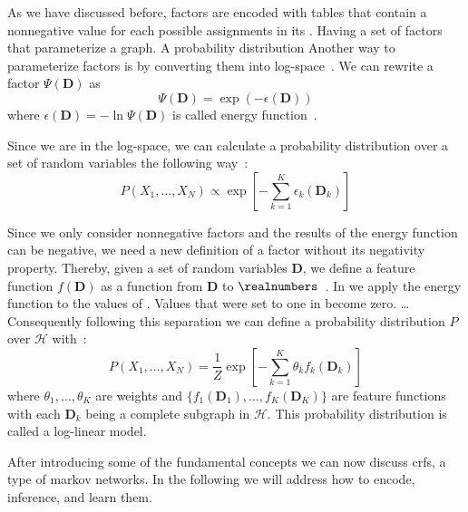 As we have discussed before, \glspl{factor} are encoded with tables that contain a nonnegative value for each possible assignments in its .
Having a set of \glspl{factor} that parameterize a graph. A probability distribution
Another way to parameterize \glspl{factor} is by converting them into log-space~\citep{koller2009probabilistic}.
We can rewrite a factor $\Psi(\bm{D})$ as
\begin{equation*}
  \label{equ:energy-function}
  \Psi(\bm{D}) = \exp(-\epsilon(\bm{D}))
\end{equation*}
where $\epsilon(\bm{D})=-\ln\Psi(\bm{D})$ is called \gls{energy function}~\citep{koller2009probabilistic}.

Since we are in the log-space, we can calculate a \gls{probability distribution} over a set of \glspl{random variable} the following way~\citep{koller2009probabilistic}:
\begin{equation*}
  \label{equ:p-energy-function}
  P(X_1,\dots,X_N) \propto \exp\left [-\sum_{k=1}^K\epsilon_k(\bm{D}_k)\right ]
\end{equation*}

Since we only consider nonnegative \glspl{factor} and the results of the \gls{energy function} can be negative, we need a new definition of a \gls{factor} without its negativity property.
Thereby, given a set of \glspl{random variable} $\bm{D}$, we define a \gls{feature function} $f(\bm{D})$ as a function from $\bm{D}$ to $\realnumbers$~\citep{koller2009probabilistic}.
In  we apply the \gls{energy function} to the values of .
Values that were set to one in  become zero. \dots{}
Consequently following this separation we can define a \gls{probability distribution} $P$ over $\mathcal{H}$ with~\citep{koller2009probabilistic}:
\begin{equation}
  \label{equ:log-linear-model}
  P(X_1,\dots,X_N) = \frac{1}{Z}\exp\left [-\sum_{k=1}^K \theta_k f_k(\bm{D}_k)\right ]
\end{equation}
where $\theta_1,\dots,\theta_K$ are weights and $\{f_1(\bm{D}_1),\dots,f_K(\bm{D}_K)\}$ are \glspl{feature function} with each $\bm{D}_k$ being a complete subgraph in $\mathcal{H}$.
This \gls{probability distribution} is called a \gls{log-linear model}.

\bigskip

After introducing some of the fundamental concepts we can now discuss \glspl{crf}, a type of \glspl{markov network}. In the following we will address how to encode, inference, and learn them.

